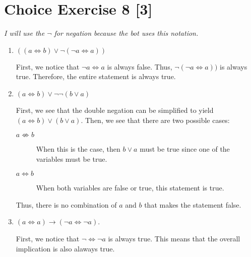 \documentclass{article}
\begin{document}
\section*{Choice Exercise 8 [3]}
\emph{I will use the \(\neg\) for negation because the bot uses this notation.}
\begin{enumerate}
    \item {
        \(((a \Leftrightarrow b) \vee \neg (\neg a \Leftrightarrow a))\)

        First, we notice that \(\neg a \Leftrightarrow a\) is always false. Thus, 
        \(\neg (\neg a \Leftrightarrow a))\) is always true. Therefore, the entire 
        statement is always true.
    }

    \item {
        \((a \Leftrightarrow b) \vee \neg \neg (b \vee a)\)

        First, we see that the double negation can be simplified to yield
        \((a \Leftrightarrow b) \vee (b \vee a)\).
        Then, we see that there are two possible cases:
        \begin{description}
            \item[\(a \not\Leftrightarrow b\)] {
                When this is the case, then \(b \vee a \) must be true since 
                one of the variables must be true.
            }
            \item[\(a \Leftrightarrow b\)] {
                When both variables are false or true, this statement is true. 
            }
        \end{description}

        Thus, there is no combination of \(a\) and \(b\) that makes the statement false.
    }

    \item {
        \((a \Leftrightarrow a) \rightarrow (\neg a \Leftrightarrow \neg a)\).

        First, we notice that \(\neg \Leftrightarrow \neg a \) is always true. 
        This means that the overall implication is also alaways true.
    }
\end{enumerate}



\end{document}
